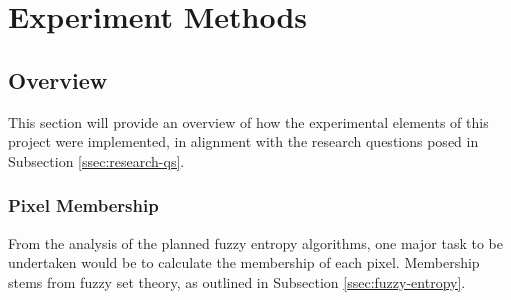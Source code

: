 \chapter{Experiment Methods}





\section{Overview}

This section will provide an overview of how the experimental elements of this project were implemented, in alignment with the research questions posed in Subsection \ref{ssec:research-qs}.

\subsection{Pixel Membership}
\label{sssec:member}

From the analysis of the planned fuzzy entropy algorithms, one major task to be undertaken would be to calculate the membership of each pixel. Membership stems from fuzzy set theory, as outlined in Subsection \ref{ssec:fuzzy-entropy}.

